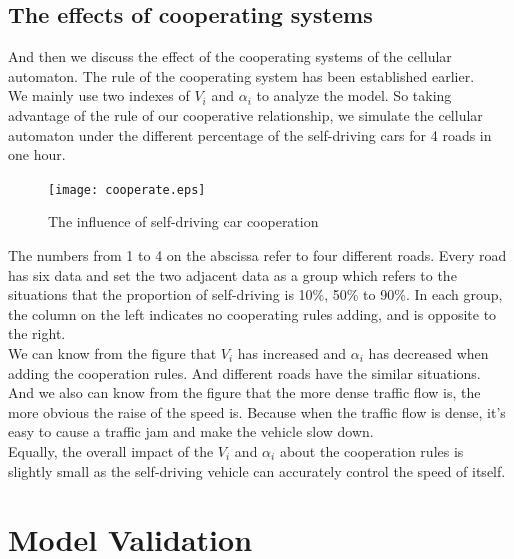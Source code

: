 \documentclass{mcmthesis}
\begin{document}
\subsection{The effects of cooperating systems}
And then we discuss the effect of the cooperating systems of the cellular automaton. The rule of the cooperating system has been established earlier. \\
\indent We mainly use two indexes of $V_{i}$ and $\alpha_{i}$ to analyze the model. So taking advantage of the rule of our cooperative relationship, we simulate the cellular automaton under the different percentage of the self-driving cars for 4 roads in one hour. 
\begin{figure}[H]
	\centerline{\texttt{[image: cooperate.eps]}}
	\caption{The influence of self-driving car cooperation}	
\end{figure}
\indent The numbers from 1 to 4 on the abscissa refer to four different roads. Every road has six data and set the two adjacent data as a group which refers to the situations that the proportion of self-driving is 10\%, 50\% to 90\%. In each group, the column on the left indicates no cooperating rules adding, and is opposite to the right.\\
\indent We can know from the figure that $V_{i}$ has increased and $\alpha_{i}$ has decreased when adding the cooperation rules. And different roads have the similar situations.\\
\indent And we also can know from the figure that the more dense traffic flow is, the more obvious the raise of the speed is. Because when the traffic flow is dense, it's easy to cause a traffic jam and make the vehicle slow down.\\
\indent Equally, the overall impact of the $V_{i}$ and $\alpha_{i}$ about the cooperation rules is slightly small as the self-driving vehicle can accurately control the speed of itself.
\section{Model Validation}
\end{document}
